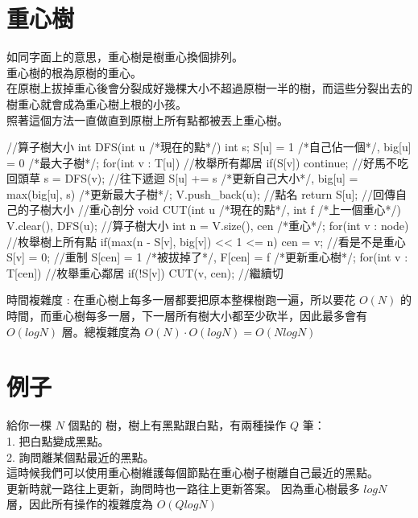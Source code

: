     \section{重心樹}
    如同字面上的意思，重心樹是樹重心換個排列。\\
    重心樹的根為原樹的重心。\\
    在原樹上拔掉重心後會分裂成好幾棵大小不超過原樹一半的樹，而這些分裂出去的樹重心就會成為重心樹上根的小孩。\\
    照著這個方法一直做直到原樹上所有點都被丟上重心樹。\\
    \begin{C++}
    //算子樹大小
    int DFS(int u /*現在的點*/){
        int s; 
        S[u] = 1 /*自己佔一個*/, big[u] = 0 /*最大子樹*/;
        for(int v : T[u]){ //枚舉所有鄰居
            if(S[v]) continue; //好馬不吃回頭草
            s = DFS(v); //往下遞迴
            S[u] += s /*更新自己大小*/, big[u] = max(big[u], s) /*更新最大子樹*/;
        }
        V.push_back(u); //點名
        return S[u]; //回傳自己的子樹大小
    }
    //重心剖分
    void CUT(int u /*現在的點*/, int f /*上一個重心*/){
        V.clear(), DFS(u); //算子樹大小
        int n = V.size(), cen /*重心*/;
        for(int v : node){ //枚舉樹上所有點
            if(max(n - S[v], big[v]) << 1 <= n) cen = v; //看是不是重心
            S[v] = 0; //重制
        }
        S[cen] = 1 /*被拔掉了*/, F[cen] = f /*更新重心樹*/;
        for(int v : T[cen]){ //枚舉重心鄰居
            if(!S[v]) CUT(v, cen); //繼續切
        }
    }
    \end{C++}
    時間複雜度 : 在重心樹上每多一層都要把原本整棵樹跑一遍，所以要花 $O(N)$ 的時間，而重心樹每多一層，下一層所有樹大小都至少砍半，因此最多會有 $O(logN)$ 層。總複雜度為 $O(N) \cdot O(logN) = O(NlogN)$
    \section{例子}
    給你一棵 $N$ 個點的 樹，樹上有黑點跟白點，有兩種操作 $Q$ 筆：\\
    1. 把白點變成黑點。\\
    2. 詢問離某個點最近的黑點。\\
    這時候我們可以使用重心樹維護每個節點在重心樹子樹離自己最近的黑點。\\
    更新時就一路往上更新，詢問時也一路往上更新答案。
    因為重心樹最多 $logN$ 層，因此所有操作的複雜度為 $O(QlogN)$

